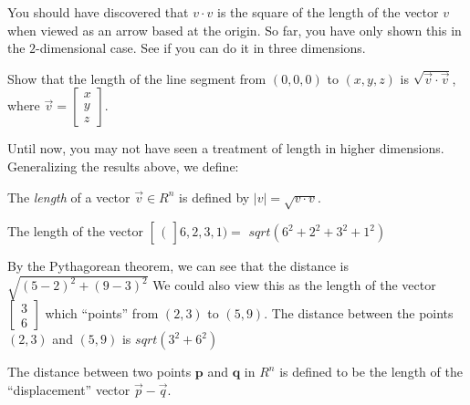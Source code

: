 \documentclass{article}
\newcommand{\R}{R}
\newcommand{\verticalvector}[1]{\begin{bmatrix}#1\end{bmatrix}}
\newcommand{\answer}[1]{#1}
\newenvironment{definition}{}{}
\newenvironment{question}{}{}
\newenvironment{hint}{}{}
\newenvironment{solution}{}{}
\newenvironment{free-response}{}{}
\begin{document}
You should have discovered that $v\cdot v$ is the square of the length
of the vector $v$ when viewed as an arrow based at the origin.  So
far, you have only shown this in the $2$-dimensional case.  See if you
can do it in three dimensions.

Show that the length of the line segment from $(0,0,0)$ to $(x,y,z)$
is $\sqrt{\vec{v} \cdot \vec{v}}$, where $\vec{v} = \begin{bmatrix} x
  \\ y \\ z\end{bmatrix}$.

\begin{free-response}
  
\end{free-response}

Until now, you may not have seen a treatment of length in higher
dimensions.  Generalizing the results above, we define:

\begin{definition}
  The \textit{length} of a vector $\vec{v} \in \R^n$ is defined by $|v| = \sqrt{v \cdot v}$.
\end{definition}

\begin{question}
  \begin{solution}
    The length of the vector $\verticalvector(6,2,3,1)=$ \answer{$sqrt(6^2+2^2+3^2+1^2)$}
  \end{solution}
\end{question}

\begin{question}
  \begin{solution}
    \begin{hint}
      By the Pythagorean theorem, we can see that  the distance is $\sqrt{(5-2)^2+(9-3)^2}$
    \end{hint}
    \begin{hint}
      We could also view this as the length of the vector $\verticalvector{3\\6}$ which ``points'' from $(2,3)$ to $(5,9)$.
    \end{hint}
    The distance between the points $(2,3)$ and $(5,9)$ is \answer{$sqrt(3^2+6^2)$}
  \end{solution}
\end{question}

\begin{definition}
  The distance between two points $\mathbf{p}$ and $\mathbf{q}$ in $\R^n$ is defined to be the length of the ``displacement'' vector $\vec{p} - \vec{q}$.
\end{definition}
\end{document}
